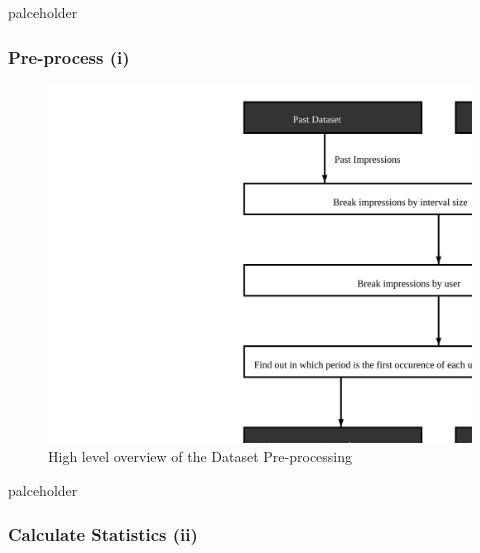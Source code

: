 palceholder

\subsubsection{Pre-process (i)}

\begin{figure}[h] \begin{center} \leavevmode
\includegraphics[]{pre_processing_i} \caption{ High level overview
of the Dataset Pre-processing} \label{fig:pre_processing_i} \end{center} \end{figure}

palceholder

\subsubsection{Calculate Statistics (ii)}

